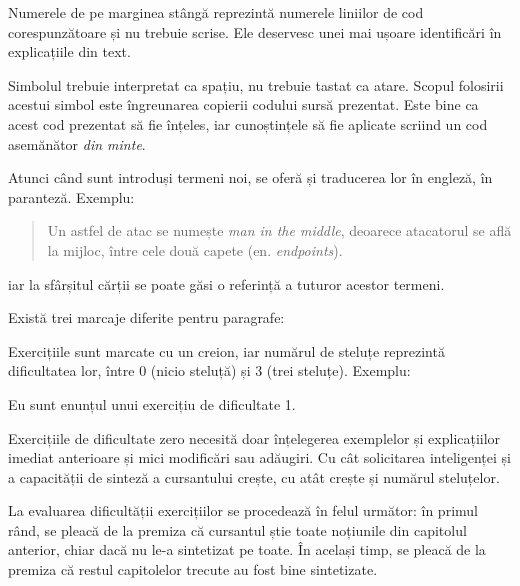 Numerele de pe marginea stângă reprezintă numerele liniilor de cod
corespunzătoare și nu trebuie scrise. Ele deservesc unei mai ușoare
identificări în explicațiile din text.

Simbolul \texttt{\raisebox{0.2em}{\Large\textvisiblespace}} trebuie interpretat ca
spațiu, nu trebuie tastat ca atare. Scopul folosirii acestui simbol este
îngreunarea copierii codului sursă prezentat. Este bine ca acest cod prezentat
să fie înțeles, iar cunoștințele să fie aplicate scriind un cod asemănător
\textit{din minte}.

Atunci când sunt introduși termeni noi, se oferă și traducerea lor în engleză,
în paranteză.  Exemplu: \begin{quote} Un astfel de atac se numește \textsl{man
in the middle}, deoarece atacatorul se află la mijloc, între cele două
capete (en.  \textsl{endpoints}).  \end{quote} iar la sfârșitul cărții se poate
găsi o referință a tuturor acestor termeni.

Există trei marcaje diferite pentru paragrafe:




Exercițiile sunt marcate cu un creion, iar numărul de steluțe reprezintă
dificultatea lor, între 0 (nicio steluță) și 3 (trei steluțe). Exemplu:
\begin{Exercise*}[title={Exercițiu de dificultate 1},difficulty=1]

Eu sunt enunțul unui exercițiu de dificultate 1.

\end{Exercise*}

Exercițiile de dificultate zero necesită doar înțelegerea exemplelor și
explicațiilor imediat anterioare și mici modificări sau adăugiri.  Cu cât
solicitarea inteligenței și a capacității de sinteză a cursantului crește, cu
atât crește și numărul steluțelor.

La evaluarea dificultății exercițiilor se procedează în felul următor: în primul
rând, se pleacă de la premiza că cursantul știe toate noțiunile din capitolul
anterior, chiar dacă nu le-a sintetizat pe toate. În același timp, se pleacă de
la premiza că restul capitolelor trecute au fost bine sintetizate.

